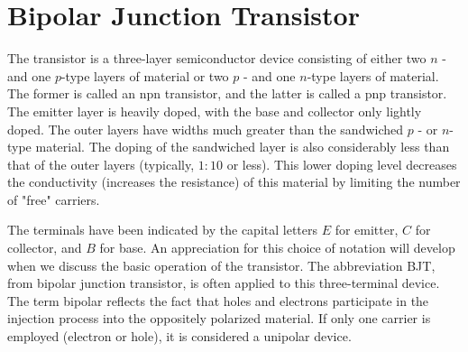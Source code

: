\chapter{Bipolar Junction Transistor}
\par The transistor is a three-layer semiconductor device consisting of either two $n$ - and one $p$-type layers of material or two $p$ - and one $n$-type layers of material. The former is called an npn transistor, and the latter is called a pnp transistor. The emitter layer is heavily doped, with the base and collector only lightly doped. The outer layers have widths much greater than the sandwiched $p$ - or $n$-type material. The doping of the sandwiched layer is also considerably less than that of the outer layers (typically, $1: 10$ or less). This lower doping level decreases the conductivity (increases the resistance) of this material by limiting the number of "free" carriers.
\par  The  terminals have been indicated by the capital letters $E$ for emitter, $C$ for collector, and $B$ for base. An appreciation for this choice of notation will develop when we discuss the basic operation of the transistor. The abbreviation BJT, from bipolar junction transistor, is often applied to this three-terminal device. The term bipolar reflects the fact that holes and electrons participate in the injection process into the oppositely polarized material. If only one carrier is employed (electron or hole), it is considered a unipolar device.
